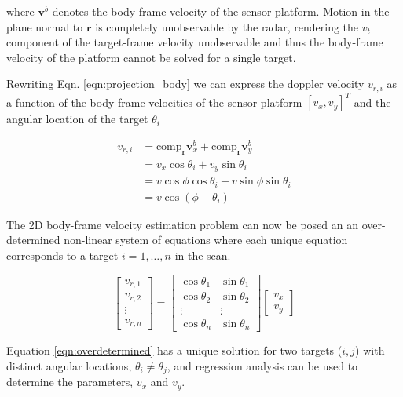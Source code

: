 \documentclass[]{article}
\begin{document}
where $\mathbf{v}^b$ denotes the body-frame velocity of the sensor platform. Motion in the plane normal to $\mathbf{r}$ is completely unobservable by the radar, rendering the $v_t$ component of the target-frame velocity unobservable and thus the body-frame velocity of the platform cannot be solved for a single target.

Rewriting Eqn. \ref{eqn:projection_body} we can express the doppler velocity $v_{r,i}$ as a function of the body-frame velocities of the sensor platform $[v_x, v_y]^T$ and the angular location of the target $\theta_i$

\begin{equation}
\begin{aligned}
	v_{r,i} &= \text{comp}_{\mathbf{r}} \mathbf{v}_x^b + \text{comp}_{\mathbf{r}} \mathbf{v}_y^b  \\
			&= v_x \cos \theta_i + v_y \sin \theta_i \\
			&= v \cos \phi \cos \theta_i + v \sin \phi \sin \theta_i \\
			&= v \cos( \phi - \theta_i)
	\end{aligned}
	\label{eqn:generative_model}
\end{equation}

The 2D body-frame velocity estimation problem can now be posed an an over-determined non-linear system of equations where each unique equation corresponds to a target $i = 1,\ldots,n$ in the scan.

\begin{equation}
	\begin{bmatrix} v_{r,1}\\ v_{r,2}\\ \vdots\\ v_{r,n} \end{bmatrix} = 
	\begin{bmatrix} \cos \theta_1 & \sin \theta_1 \\ \cos \theta_2 & \sin \theta_2 \\ \vdots & \vdots \\ \cos \theta_n & \sin \theta_n \end{bmatrix}
	\begin{bmatrix} v_x \\ v_y  \end{bmatrix}
	\label{eqn:overdetermined}
\end{equation}

Equation \ref{eqn:overdetermined} has a unique solution for two targets ($i,j$) with distinct angular locations, $\theta_i \neq \theta_j$, and regression analysis can be used to determine the parameters, $v_x$ and $v_y$.
\end{document}
